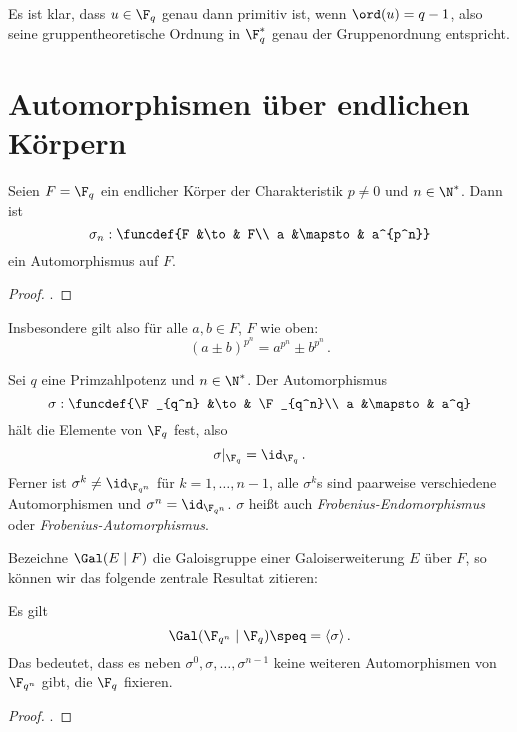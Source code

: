 \begin{bemerkung}
  Es ist klar, dass $u\in \F_q$ genau dann primitiv ist, wenn 
  $\ord(u) = q-1$, also seine gruppentheoretische Ordnung in $\F_q^\ast$ genau
  der Gruppenordnung entspricht.
\end{bemerkung}


\section{Automorphismen über endlichen Körpern}

\begin{satz}
  \label{satz:frob_auto}
  Seien $F = \F_q$ ein endlicher Körper der Charakteristik $p\neq 0$ und 
  $n\in \N^\ast$. Dann ist
  \[ \sigma_n: \funcdef{F &\to& F\\
    a &\mapsto& a^{p^n}}\]
  ein Automorphismus auf $F$.
\end{satz}
\begin{proof}
  \autocite[Corollary 3.18]{wan2003lectures}.
\end{proof}

\begin{bemerkung}
  Insbesondere gilt also für alle $a,b\in F$, $F$ wie oben:
  \[ (a\pm b)^{p^n} = a^{p^n} \pm b^{p^n}\,.\]
\end{bemerkung}

\begin{satz}
  \label{satz:frob_fix}
  Sei $q$ eine Primzahlpotenz und $n\in \N^\ast$. Der Automorphismus
  \[ \sigma: \funcdef{\F_{q^n} &\to& \F_{q^n}\\
    a &\mapsto& a^q}\]
  hält die Elemente von $\F_q$ fest, also 
  \[ \sigma |_{\F_q} = \id_{\F_q}\,.\]
  Ferner ist $\sigma^k \neq \id_{\F_{q^n}}$ für $k=1,\ldots,n-1$, alle
  $\sigma^k$s sind paarweise verschiedene Automorphismen und 
  $\sigma^n = \id_{\F_{q^n}}$.
  $\sigma$ heißt auch \emph{Frobenius-Endomorphismus} oder
  \emph{Frobenius-Automorphismus}.
\end{satz}


Bezeichne $\Gal(E \mid F)$ die Galoisgruppe einer Galoiserweiterung $E$ über
$F$, so können wir das folgende zentrale Resultat zitieren:

\begin{satz}
  \label{satz:frob_sind_alle_autos}
  Es gilt
  \[ \Gal(\F_{q^n}\mid \F_q) \speq= \langle \sigma\rangle\,.\]
  Das bedeutet, dass es neben $\sigma^0,\sigma,\ldots,\sigma^{n-1}$ keine weiteren
  Automorphismen von $\F_{q^n}$ gibt, die $\F_q$ fixieren.
\end{satz}
\begin{proof}
  \autocite[Theorem 7.3]{wan2003lectures}.
\end{proof}

